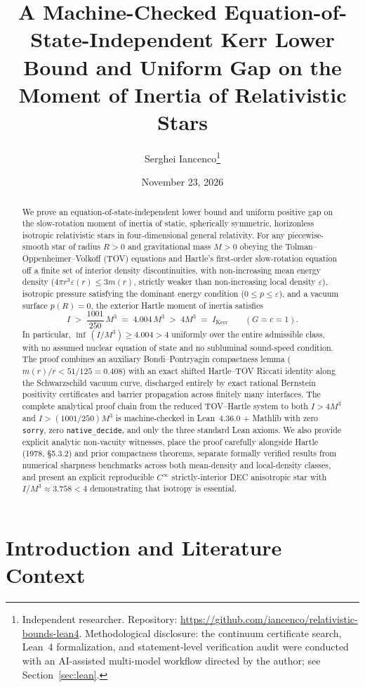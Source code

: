 \documentclass[11pt]{article}
\title{\textbf{A Machine-Checked Equation-of-State-Independent Kerr Lower Bound and Uniform Gap on the Moment of Inertia of Relativistic Stars}}
\author{Serghei Iancenco\thanks{Independent researcher. Repository: \url{https://github.com/iancenco/relativistic-bounds-lean4}. Methodological disclosure: the continuum certificate search, Lean~4 formalization, and statement-level verification audit were conducted with an AI-assisted multi-model workflow directed by the author; see Section~\ref{sec:lean}.}}
\date{November 23, 2026}
\theoremstyle{plain}
\theoremstyle{definition}
\newcommand{\eps}{\varepsilon}
\begin{document}
\maketitle

\begin{abstract}
We prove an equation-of-state-independent lower bound and uniform positive gap on the slow-rotation moment of inertia of static, spherically symmetric, horizonless isotropic relativistic stars in four-dimensional general relativity. For any piecewise-smooth star of radius $R>0$ and gravitational mass $M>0$ obeying the Tolman--Oppenheimer--Volkoff (TOV) equations and Hartle's first-order slow-rotation equation off a finite set of interior density discontinuities, with non-increasing mean energy density ($4\pi r^3 \eps(r) \le 3 m(r)$, strictly weaker than non-increasing local density $\eps$), isotropic pressure satisfying the dominant energy condition ($0 \le p \le \eps$), and a vacuum surface $p(R)=0$, the exterior Hartle moment of inertia satisfies
\[
  I \;>\; \frac{1001}{250}\,M^3 \;=\; 4.004\,M^3 \;>\; 4 M^3 \;=\; I_{\mathrm{Kerr}} \qquad (G = c = 1).
\]
In particular, $\inf \,(I/M^3) \ge 4.004 > 4$ uniformly over the entire admissible class, with no assumed nuclear equation of state and no subluminal sound-speed condition. The proof combines an auxiliary Bondi--Pontryagin compactness lemma ($m(r)/r < 51/125 = 0.408$) with an exact shifted Hartle--TOV Riccati identity along the Schwarzschild vacuum curve, discharged entirely by exact rational Bernstein positivity certificates and barrier propagation across finitely many interfaces. The complete analytical proof chain from the reduced TOV--Hartle system to both $I > 4 M^3$ and $I > (1001/250) M^3$ is machine-checked in Lean~4.36.0 + Mathlib with zero \texttt{sorry}, zero \texttt{native\_decide}, and only the three standard Lean axioms. We also provide explicit analytic non-vacuity witnesses, place the proof carefully alongside Hartle (1978, \S5.3.2) and prior compactness theorems, separate formally verified results from numerical sharpness benchmarks across both mean-density and local-density classes, and present an explicit reproducible $C^\infty$ strictly-interior DEC anisotropic star with $I/M^3 \approx 3.758 < 4$ demonstrating that isotropy is essential.
\end{abstract}

\tableofcontents

\section{Introduction and Literature Context}
\label{sec:intro}
\end{document}
